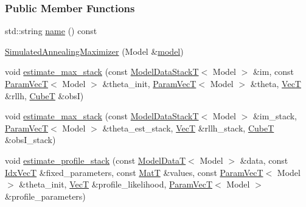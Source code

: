 \subsubsection*{Public Member Functions}
\begin{DoxyCompactItemize}
\item 
std\+::string \hyperlink{classmappel_1_1SimulatedAnnealingMaximizer_aac0fdc481666bf76ec4387c9c57c9e71}{name} () const 
\item 
\hyperlink{classmappel_1_1SimulatedAnnealingMaximizer_a76e0c1b5ca19fc31d10dded7b992e0cb}{Simulated\+Annealing\+Maximizer} (Model \&\hyperlink{classmappel_1_1Estimator_a8322546d87ccdf01f8b0dcd9dae509f0}{model})
\item 
void \hyperlink{classmappel_1_1ThreadedEstimator_afb7a2e27b4e8dcc2fa604f83344461fe}{estimate\+\_\+max\+\_\+stack} (const \hyperlink{namespacemappel_aaeb6665bc57476dd93c2df6ad8bc4768}{Model\+Data\+StackT}$<$ Model $>$ \&im, const \hyperlink{namespacemappel_a0f86d3153e4e27b095012f140eea58de}{Param\+VecT}$<$ Model $>$ \&theta\+\_\+init, \hyperlink{namespacemappel_a0f86d3153e4e27b095012f140eea58de}{Param\+VecT}$<$ Model $>$ \&theta, \hyperlink{namespacemappel_a2225ad69f358daa3f4f99282a35b9a3a}{VecT} \&rllh, \hyperlink{namespacemappel_ab2afab4e6c8805e83946670d882768c2}{CubeT} \&obsI)
\item 
void \hyperlink{classmappel_1_1Estimator_aa1b1c2677df2c6ea9fcf67b6a0856e46}{estimate\+\_\+max\+\_\+stack} (const \hyperlink{namespacemappel_aaeb6665bc57476dd93c2df6ad8bc4768}{Model\+Data\+StackT}$<$ Model $>$ \&im\+\_\+stack, \hyperlink{namespacemappel_a0f86d3153e4e27b095012f140eea58de}{Param\+VecT}$<$ Model $>$ \&theta\+\_\+est\+\_\+stack, \hyperlink{namespacemappel_a2225ad69f358daa3f4f99282a35b9a3a}{VecT} \&rllh\+\_\+stack, \hyperlink{namespacemappel_ab2afab4e6c8805e83946670d882768c2}{CubeT} \&obs\+I\+\_\+stack)
\item 
void \hyperlink{classmappel_1_1ThreadedEstimator_aebbf686f95be1331ff85cecd5a3c97db}{estimate\+\_\+profile\+\_\+stack} (const \hyperlink{namespacemappel_a97f050df953605381ae9c901c3b125f1}{Model\+DataT}$<$ Model $>$ \&data, const \hyperlink{namespacemappel_ac63743dcd42180127307cd0e4ecdd784}{Idx\+VecT} \&fixed\+\_\+parameters, const \hyperlink{namespacemappel_a7091ab87c528041f7e2027195fad8915}{MatT} \&values, const \hyperlink{namespacemappel_a0f86d3153e4e27b095012f140eea58de}{Param\+VecT}$<$ Model $>$ \&theta\+\_\+init, \hyperlink{namespacemappel_a2225ad69f358daa3f4f99282a35b9a3a}{VecT} \&profile\+\_\+likelihood, \hyperlink{namespacemappel_a0f86d3153e4e27b095012f140eea58de}{Param\+VecT}$<$ Model $>$ \&profile\+\_\+parameters)

\end{DoxyCompactItemize}
